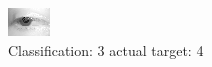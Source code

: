 \begin{figure}[h!]
\begin{center}
\includegraphics[width=0.60\columnwidth]{figures/ID2588_class_3_target_4.png}
\end{center}
\caption{ Classification: 3 actual target: 4}
\label{fig:ID2588_class_3_target_4}
\end{figure}
